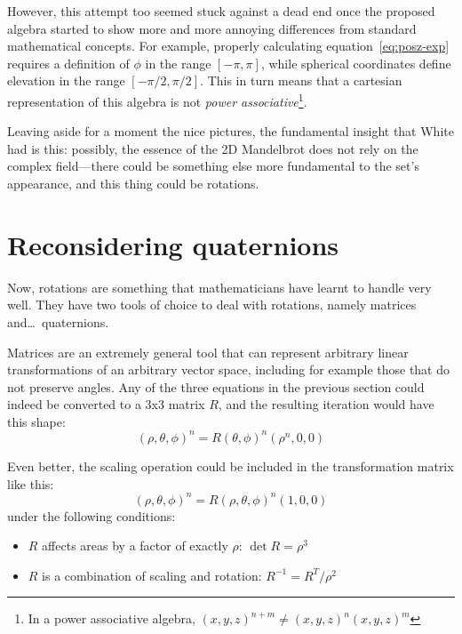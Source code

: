 \documentclass{article}
\begin{document}
\noindent
However, this attempt too seemed stuck against a dead end once the
proposed algebra started to show more and more annoying differences
from standard mathematical concepts.  For example, properly
calculating equation~\ref{eq:posz-exp} requires a definition of
$\phi$ in the range $[-\pi,\pi]$, while spherical coordinates define
elevation in the range $[-\pi/2,\pi/2]$.  This in turn means that a
cartesian representation of this algebra is not \emph{power
  associative}\footnote{In a power associative algebra, $(x,y,z)^{n+m}
  \ne (x,y,z)^n (x,y,z)^m$}.

Leaving aside for a moment the nice pictures, the fundamental insight
that White had is this: possibly, the essence of the 2D Mandelbrot does
not rely on the complex field---there could be something else more
fundamental to the set's appearance, and this thing could be rotations.

\section{Reconsidering quaternions}

Now, rotations are something that mathematicians have learnt to handle
very well.  They have two tools of choice to deal with rotations, namely
matrices and\dots\ quaternions.

Matrices are an extremely general tool that can represent arbitrary
linear transformations of an arbitrary vector space, including for
example those that do not preserve angles.  Any of the three equations
in the previous section could indeed be converted to a 3x3 matrix $R$,
and the resulting iteration would have this shape:
\begin{equation*}
  (\rho,\theta,\phi)^n = R(\theta,\phi)^n (\rho^n,0,0)
\end{equation*}

\noindent
Even better, the scaling operation could be included in the transformation
matrix like this:
\begin{equation*}
  (\rho,\theta,\phi)^n = R(\rho,\theta,\phi)^n (1,0,0)
\end{equation*}
\noindent
under the following conditions:
\begin{itemize}
\item $R$ affects areas by a factor of exactly $\rho$: $\det R = \rho^3$
\item $R$ is a combination of scaling and rotation: $R^{-1} = R^T / \rho^2$
\end{itemize}
\end{document}
